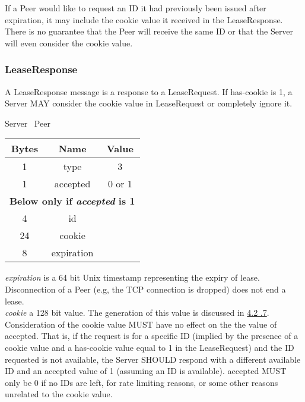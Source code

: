 If a Peer would like to request an ID it had previously been issued after expiration, it may include the cookie
value it received in the LeaseResponse. There is no guarantee that the Peer will receive the same ID or that the Server
will even consider the cookie value.

\subsubsection{LeaseResponse}

A LeaseResponse message is a response to a LeaseRequest. If has-cookie is 1, a Server MAY consider the cookie value
in LeaseRequest or completely
ignore it.

\begin{center}
    Server \textrightarrow\ Peer\\
    \begin{tabular}{|c|c|c|}
        \hline
        \textbf{Bytes} & \textbf{Name} & \textbf{Value} \\
        \hline
        1              & type          & 3              \\
        \hline
        1              & accepted      & 0 or 1         \\
        \hline
        \multicolumn{3}{|c|}{\textbf{Below only if \emph{accepted} is 1} } \\
        \hline
        4              & id            &                \\
        \hline
        24             & cookie        &                \\
        \hline
        8              & expiration    &                \\
        \hline
    \end{tabular}
\end{center}

\emph{expiration} is a 64 bit Unix timestamp representing the expiry of lease. Disconnection of a Peer (e.g,
the TCP connection is dropped) does not end a lease.\\

\emph{cookie} a 128 bit value. The generation of this value is discussed in \hyperlink{subsubsection.4.2.7}{4.2
.7}.\\

Consideration of the cookie value MUST have no effect on the the value of accepted. That is, if the
request is for a specific ID (implied by the presence of a cookie value and a has-cookie value equal to 1
in the LeaseRequest) and the ID requested is not available, the Server SHOULD respond with a different
available ID and an accepted value of 1 (assuming an ID is available). accepted MUST only be 0 if no IDs are left,
for rate limiting reasons, or some other reasons unrelated to the cookie value.

